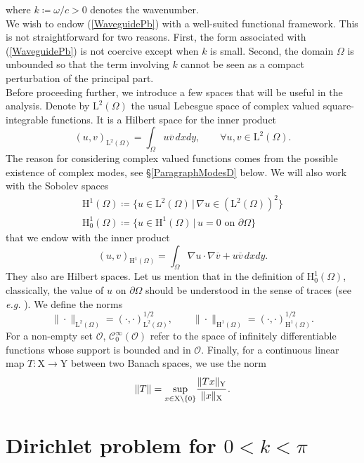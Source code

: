 \documentclass[11pt,a4paper]{report}
\newcommand{\om}{\omega}
\newcommand{\Om}{\Omega}
\newcommand{\mrm}[1]{\mathrm{#1}}
\newcommand{\mL}{\mrm{L}}
\newcommand{\mH}{\mrm{H}}
\newcommand{\mX}{\mrm{X}}
\begin{document}
where $k\coloneqq\om/c>0$ denotes the wavenumber.\\
\newline 
We wish to endow (\ref{WaveguidePb}) with a well-suited functional framework. This is not straightforward for two reasons. First, the form associated with (\ref{WaveguidePb}) is not coercive except when $k$ is small. Second, the domain $\Om$ is unbounded so that the term involving $k$ cannot be seen as a compact perturbation of the principal part.\\
\newline
Before proceeding further, we introduce a few spaces that will be useful in the analysis. Denote by $\mL^2(\Om)$ the usual Lebesgue space of complex valued square-integrable functions. It is a Hilbert space for the inner product 
\[
(u,v)_{\mL^2(\Om)}=\int_{\Om} u \overline{v}\,dxdy,\qquad\forall u,v\in \mL^2(\Om).
\]
The reason for considering complex valued functions comes from the possible existence of complex modes, see \S\ref{ParagraphModesD} below. We will also work with the Sobolev spaces
\[
\begin{array}{l}
\mH^1(\Om)\coloneqq\{u\in\mL^2(\Om)\,|\,\nabla u\in (\mL^2(\Om))^2\}\\[2pt]
\mH^1_0(\Om)\coloneqq\{u\in\mH^1(\Om)\,|\,u=0\mbox{ on  }\partial\Om\}
\end{array}
\]
that we endow with the inner product
\[
(u,v)_{\mH^1(\Om)}=\int_{\Om}\nabla u\cdot\nabla \overline{v}+u\overline{v}\,dxdy.
\]
They also are Hilbert spaces. Let us mention that in the definition of $\mH^1_0(\Om)$, classically, the value of $u$ on $\partial\Om$ should be understood in the sense of traces (see \textit{e.g.} \cite[Thm.\,3.37]{McLe00}). We define the norms 
\[
\|\cdot\|_{\mL^2(\Om)}=(\cdot,\cdot)_{\mL^2(\Om)}^{1/2},\qquad \|\cdot\|_{\mH^1(\Om)}=(\cdot,\cdot)_{\mH^1(\Om)}^{1/2}.
\]
For a non-empty  set $\mathcal{O}$, $\mathscr{C}^{\infty}_0(\mathcal{O})$ refer to the space of infinitely differentiable functions whose support is bounded and in $\mathcal{O}$. Finally, for a continuous linear map $T: \mrm{X}\to \mrm{Y}$ between two Banach spaces, we use the norm
\[
\|T\|=\underset{x\in\mX\setminus\{0\}}{\sup}\cfrac{\|Tx\|_{\mrm{Y}}}{\|x\|_{\mrm{X}}}\,.
\]


\section{Dirichlet problem for $0<k<\pi$}
\end{document}
